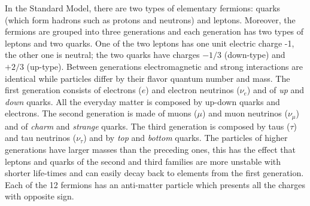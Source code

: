 In the Standard Model, there are two types of elementary fermions: quarks (which form hadrons such as protons and neutrons) and leptons. 
Moreover, the fermions are grouped into three generations and each generation has two types of leptons and two quarks. One of the two leptons has one unit electric charge -1, the other one is neutral; the two quarks have charges $-1/3$ (down-type) and $+2/3$ (up-type). Between generations electromagnetic and strong interactions are identical while particles differ by their flavor quantum number and mass.  The first generation consists of electrons ($e$) and electron neutrinos ($\nu_e$) and of \emph{up} and \emph{down} quarks. All the everyday matter is composed by up-down quarks and electrons. The second generation is made of muons ($\mu$) and muon neutrinos ($\nu_\mu$) and of \emph{charm} and \emph{strange} quarks. The third generation is composed by taus ($\tau$) and tau neutrinos ($\nu_\tau$) and by \emph{top} and \emph{bottom} quarks. The particles of higher generations have larger masses than the preceding ones, this has the effect that leptons and quarks of the second and third families are more unstable with shorter life-times and can easily decay back to elements from the first generation.\\
Each of the 12 fermions has an anti-matter particle which presents all the charges with opposite sign.

